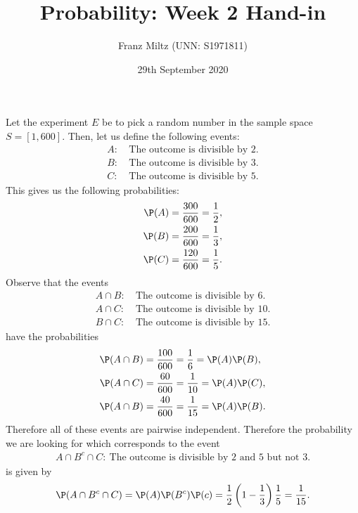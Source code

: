 \documentclass{article}
\begin{document}
\title{Probability: Week 2 Hand-in}
\author{Franz Miltz (UNN: S1971811)}
\date{29th September 2020}
\maketitle
\noindent Let the experiment $E$ be to pick a random number in the sample space
$S=[1,600]$. Then, let us define the following events:
\begin{align*}
  A:\: & \text{The outcome is divisible by 2.} \\
  B:\: & \text{The outcome is divisible by 3.} \\
  C:\: & \text{The outcome is divisible by 5.}
\end{align*}
This gives us the following probabilities:
\begin{align*}
  \P(A)=\frac{300}{600}=\frac{1}{2}, \\
  \P(B)=\frac{200}{600}=\frac{1}{3}, \\
  \P(C)=\frac{120}{600}=\frac{1}{5}.
\end{align*}
Observe that the events
\begin{align*}
  A\cap B:\: & \text{The outcome is divisible by 6.}  \\
  A\cap C:\: & \text{The outcome is divisible by 10.} \\
  B\cap C:\: & \text{The outcome is divisible by 15.}
\end{align*}
have the probabilities
\begin{align*}
  \P(A\cap B) & =\frac{100}{600}=\frac{1}{6}=\P(A)\P(B), \\
  \P(A\cap C) & =\frac{60}{600}=\frac{1}{10}=\P(A)\P(C), \\
  \P(A\cap B) & =\frac{40}{600}=\frac{1}{15}=\P(A)\P(B).
\end{align*}
Therefore all of these events are pairwise independent. Therefore the
probability we are looking for which corresponds to the event
\begin{align*}
  A\cap B^c \cap C:\:\text{The outcome is divisible by 2 and 5 but not 3.}
\end{align*}
is given by
\begin{align*}
  \P(A\cap B^c\cap C)= \P(A)\P(B^c)\P(c) = \frac{1}{2}\left(1-\frac{1}{3}\right)\frac{1}{5}=\frac{1}{15}.
\end{align*}
\end{document}
